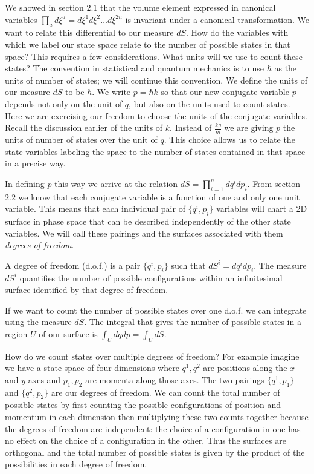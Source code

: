 \documentclass{article}
\begin{document}
	We showed in section $2.1$ that the volume element expressed in canonical variables $\prod_a d \xi^{a} = d\xi^1 d\xi^2 \dots d \xi^{2n}$ is invariant under a canonical transformation. We want to relate this differential to our measure $dS$. How do the variables with which we label our state space relate to the number of possible states in that space? This requires a few considerations. What units will we use to count these states? The convention in statistical and quantum mechanics is to use $\hbar$ as the units of number of states; we will continue this convention. We define the units of our measure $dS$ to be $\hbar$. We write $p = \hbar k$ so that our new conjugate variable $p$ depends not only on the unit of $q$, but also on the units used to count states. Here we are exercising our freedom to choose the units of the conjugate variables. Recall the discussion earlier of the units of $k$. Instead of $\frac{kg}{m}$ we are giving $p$ the units of number of states over the unit of $q$. This choice allows us to relate the state variables labeling the space to the number of states contained in that space in a precise way. 
	
	In defining $p$ this way we arrive at the relation $dS = \prod \limits_{i = 1}^{n} dq^{i}dp_i$. From section $2.2$ we know that each conjugate variable is a function of one and only one unit variable. This means that each individual pair of $\{q^i,p_i\}$ variables will chart a 2D surface in phase space that can be described independently of the other state variables. We will call these pairings and the surfaces associated with them \textit{degrees of freedom}.

\begin{defn}
	A degree of freedom (d.o.f.) is a pair $\{q^i,p_i \}$ such that $dS^i = dq^i dp_i$. The measure $dS^i$ quantifies the number of possible configurations within an infinitesimal surface identified by that degree of freedom.
\end{defn}

	If we want to count the number of possible states over one d.o.f. we can integrate using the measure $dS$. The integral that gives the number of possible states in a region $U$ of our surface is $\int_{U} dq dp = \int_{U} dS$.

	How do we count states over multiple degrees of freedom? For example imagine we have a state space of four dimensions where $q^1,q^2$ are positions along the $x$ and $y$ axes and $p_1,p_2$ are momenta along those axes. The two pairings $\{q^1,p_1 \}$ and $\{q^2,p_2 \}$ are our degrees of freedom. We can count the total number of possible states by first counting the possible configurations of position and momentum in each dimension then multiplying these two counts together because the degrees of freedom are independent: the choice of a configuration in one has no effect on the choice of a configuration in the other. Thus the surfaces are orthogonal and the total number of possible states is given by the product of the possibilities in each degree of freedom.
\end{document}
